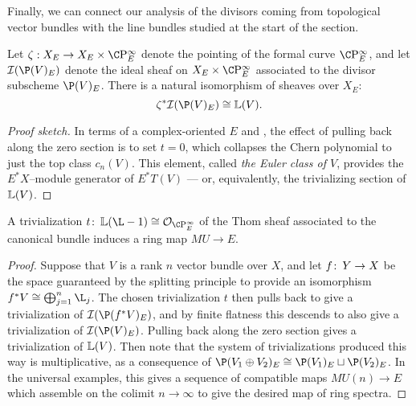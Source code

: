 Finally, we can connect our analysis of the divisors coming from topological vector bundles with the line bundles studied at the start of the section.
\begin{lemma}
Let $\zeta: X_E \to X_E \times \CP^\infty_E$ denote the pointing of the formal curve $\CP^\infty_E$, and let $\sheaf I(\P(V)_E)$ denote the ideal sheaf on $X_E \times \CP^\infty_E$ associated to the divisor subscheme $\P(V)_E$.  There is a natural isomorphism of sheaves over $X_E$: \[\zeta^* \sheaf I(\P(V)_E) \cong \ThomSheaf{V}.\]
\end{lemma}
\begin{proof}[Proof sketch]
In terms of a complex-oriented $E$ and , the effect of pulling back along the zero section is to set $t = 0$, which collapses the Chern polynomial to just the top class $c_n(V)$.  This element, called \textit{the Euler class of $V$}, provides the $E^* X$--module generator of $E^* T(V)$ --- or, equivalently, the trivializing section of $\mathbb{L}(V)$.
\end{proof}

\begin{theorem}\label{ComplexOrientationsInTermsOfTrivs}
A trivialization $t\co \ThomSheaf{\L - 1} \cong \sheaf O_{\CP^\infty_E}$ of the Thom sheaf associated to the canonical bundle induces a ring map $MU \to E$.
\end{theorem}
\begin{proof}
Suppose that $V$ is a rank $n$ vector bundle over $X$, and let $f\colon\thinspace Y \to X$ be the space guaranteed by the splitting principle to provide an isomorphism $f^* V \cong \bigoplus_{j=1}^n \L_j$.  The chosen trivialization $t$ then pulls back to give a trivialization of $\sheaf I(\P(f^* V)_E)$, and by finite flatness this descends to also give a trivialization of $\sheaf I(\P(V)_E)$.  Pulling back along the zero section gives a trivialization of $\mathbb{L}(V)$.  Then note that the system of trivializations produced this way is multiplicative, as a consequence of $\P(V_1 \oplus V_2)_E \cong \P(V_1)_E \sqcup \P(V_2)_E$.  In the universal examples, this gives a sequence of compatible maps $MU(n) \to E$ which assemble on the colimit $n \to \infty$ to give the desired map of ring spectra.
\end{proof}










